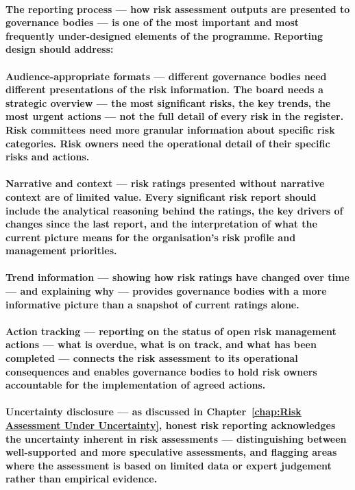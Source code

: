 \paragraph{The reporting process — how risk assessment outputs are presented to governance bodies — is one of the most important and most frequently under-designed elements of the programme. Reporting design should address:}
\paragraph{\textbf{Audience-appropriate formats} — different governance bodies need different presentations of the risk information. The board needs a strategic overview — the most significant risks, the key trends, the most urgent actions — not the full detail of every risk in the register. Risk committees need more granular information about specific risk categories. Risk owners need the operational detail of their specific risks and actions.}
\paragraph{\textbf{Narrative and context} — risk ratings presented without narrative context are of limited value. Every significant risk report should include the analytical reasoning behind the ratings, the key drivers of changes since the last report, and the interpretation of what the current picture means for the organisation's risk profile and management priorities.}
\paragraph{\textbf{Trend information} — showing how risk ratings have changed over time — and explaining why — provides governance bodies with a more informative picture than a snapshot of current ratings alone.}
\paragraph{\textbf{Action tracking} — reporting on the status of open risk management actions — what is overdue, what is on track, and what has been completed — connects the risk assessment to its operational consequences and enables governance bodies to hold risk owners accountable for the implementation of agreed actions.}
\paragraph{\textbf{Uncertainty disclosure} — as discussed in Chapter~\ref{chap:Risk Assessment Under Uncertainty}, honest risk reporting acknowledges the uncertainty inherent in risk assessments — distinguishing between well-supported and more speculative assessments, and flagging areas where the assessment is based on limited data or expert judgement rather than empirical evidence.}

